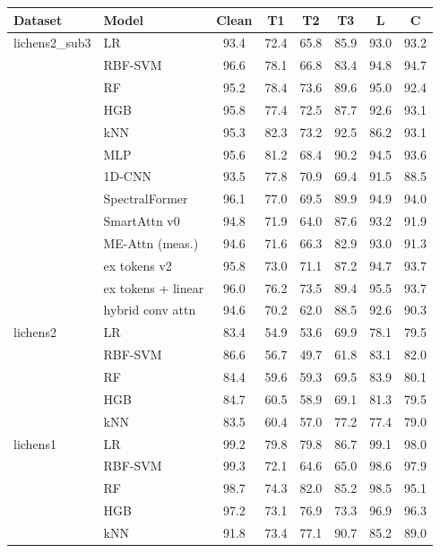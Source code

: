 \small
\begin{tabular}{llcccccc}
\toprule
Dataset & Model & Clean & T1 & T2 & T3 & L & C \\
\midrule
lichens2_sub3 & LR & 93.4 & 72.4 & 65.8 & 85.9 & 93.0 & 93.2 \\
 & RBF-SVM & 96.6 & 78.1 & 66.8 & 83.4 & 94.8 & 94.7 \\
 & RF & 95.2 & 78.4 & 73.6 & 89.6 & 95.0 & 92.4 \\
 & HGB & 95.8 & 77.4 & 72.5 & 87.7 & 92.6 & 93.1 \\
 & kNN & 95.3 & 82.3 & 73.2 & 92.5 & 86.2 & 93.1 \\
 & MLP & 95.6 & 81.2 & 68.4 & 90.2 & 94.5 & 93.6 \\
 & 1D-CNN & 93.5 & 77.8 & 70.9 & 69.4 & 91.5 & 88.5 \\
 & SpectralFormer & 96.1 & 77.0 & 69.5 & 89.9 & 94.9 & 94.0 \\
 & SmartAttn v0 & 94.8 & 71.9 & 64.0 & 87.6 & 93.2 & 91.9 \\
 & ME-Attn (meas.) & 94.6 & 71.6 & 66.3 & 82.9 & 93.0 & 91.3 \\
 & ex tokens v2 & 95.8 & 73.0 & 71.1 & 87.2 & 94.7 & 93.7 \\
 & ex tokens + linear & 96.0 & 76.2 & 73.5 & 89.4 & 95.5 & 93.7 \\
 & hybrid conv attn & 94.6 & 70.2 & 62.0 & 88.5 & 92.6 & 90.3 \\
\midrule
lichens2 & LR & 83.4 & 54.9 & 53.6 & 69.9 & 78.1 & 79.5 \\
 & RBF-SVM & 86.6 & 56.7 & 49.7 & 61.8 & 83.1 & 82.0 \\
 & RF & 84.4 & 59.6 & 59.3 & 69.5 & 83.9 & 80.1 \\
 & HGB & 84.7 & 60.5 & 58.9 & 69.1 & 81.3 & 79.5 \\
 & kNN & 83.5 & 60.4 & 57.0 & 77.2 & 77.4 & 79.0 \\
\midrule
lichens1 & LR & 99.2 & 79.8 & 79.8 & 86.7 & 99.1 & 98.0 \\
 & RBF-SVM & 99.3 & 72.1 & 64.6 & 65.0 & 98.6 & 97.9 \\
 & RF & 98.7 & 74.3 & 82.0 & 85.2 & 98.5 & 95.1 \\
 & HGB & 97.2 & 73.1 & 76.9 & 73.3 & 96.9 & 96.3 \\
 & kNN & 91.8 & 73.4 & 77.1 & 90.7 & 85.2 & 89.0 \\

\end{tabular}
